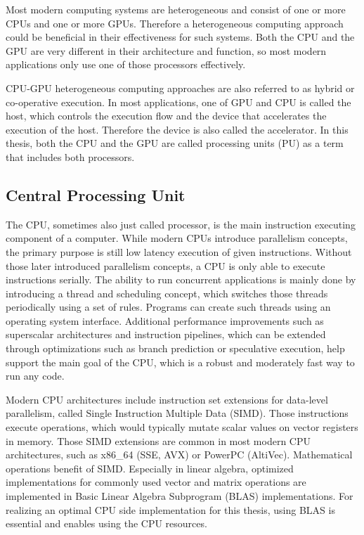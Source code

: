 Most modern computing systems are heterogeneous and consist of one or more CPUs and one or more GPUs. Therefore a heterogeneous computing approach could be beneficial in their effectiveness for such systems. Both the CPU and the GPU are very different in their architecture and function, so most modern applications only use one of those processors effectively.

CPU-GPU heterogeneous computing approaches are also referred to as hybrid or co-operative execution. In most applications, one of GPU and CPU is called the host, which controls the execution flow and the device that accelerates the execution of the host. Therefore the device is also called the accelerator. In this thesis, both the CPU and the GPU are called processing units (PU) as a term that includes both processors.

\subsection{Central Processing Unit}
The CPU, sometimes also just called processor, is the main instruction executing component of a computer. While modern CPUs introduce parallelism concepts, the primary purpose is still low latency execution of given instructions.
Without those later introduced parallelism concepts, a CPU is only able to execute instructions serially. The ability to run concurrent applications is mainly done by introducing a thread and scheduling concept, which switches those threads periodically using a set of rules. Programs can create such threads using an operating system interface.
Additional performance improvements such as superscalar architectures and instruction pipelines, which can be extended through optimizations such as branch prediction or speculative execution, help support the main goal of the CPU, which is a robust and moderately fast way to run any code.

Modern CPU architectures include instruction set extensions for data-level parallelism, called Single Instruction Multiple Data (SIMD). Those instructions execute operations, which would typically mutate scalar values on vector registers in memory. Those SIMD extensions are common in most modern CPU architectures, such as x86\_64 (SSE, AVX) or PowerPC (AltiVec). Mathematical operations benefit of SIMD. Especially in linear algebra, optimized implementations for commonly used vector and matrix operations are implemented in Basic Linear Algebra Subprogram (BLAS) implementations. For realizing an optimal CPU side implementation for this thesis, using BLAS is essential and enables using the CPU resources.


